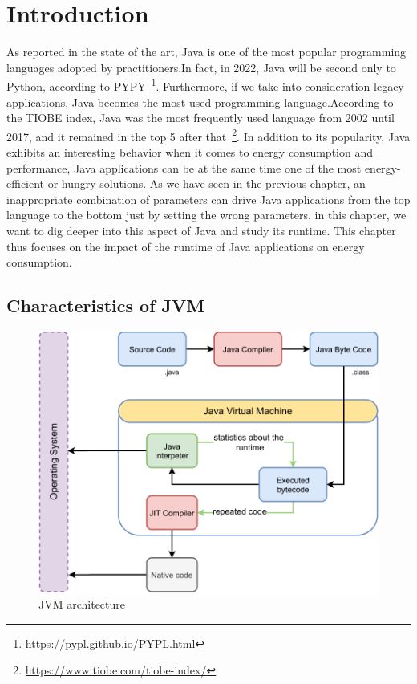 \section{Introduction}
As reported in the state of the art, Java is one of the most popular programming languages adopted by practitioners.In fact, in 2022, Java will be second only to Python, according to PYPY~\footnote{\url{https://pypl.github.io/PYPL.html}}.
Furthermore, if we take into consideration legacy applications, Java becomes the most used programming language.According to the TIOBE index, Java was the most frequently used language from 2002 until 2017, and it remained in the top 5 after that~\footnote{\url{https://www.tiobe.com/tiobe-index/}}.
In addition to its popularity, Java exhibits an interesting behavior when it comes to energy consumption and performance, Java applications can be at the same time one of the most energy-efficient or hungry solutions.
As we have seen in the previous chapter, an inappropriate combination of parameters can drive Java applications from the top language to the bottom just by setting the wrong parameters.
in this chapter, we want to dig deeper into this aspect of Java and study its runtime.
This chapter thus focuses on the impact of the runtime of Java applications on energy consumption.

\subsection{Characteristics of JVM}
\begin{figure}%
    \centering
    \includegraphics[width=\linewidth]{imgs/Jvm_architecture}
    \caption{JVM architecture}
    \label{fig:JVM_architecture}
\end{figure}

